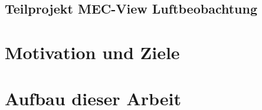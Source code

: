 \subsection{Teilprojekt MEC-View Luftbeobachtung}
\label{sec:mecview_sim}

\section{Motivation und Ziele}
\label{sec:motivation_goals}


\section{Aufbau dieser Arbeit}
\label{sec:aufbau}